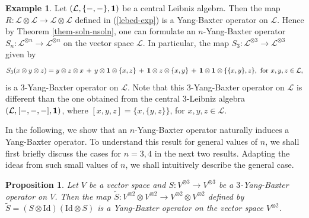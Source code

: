 \documentclass[a4paper,reqno,10pt]{amsart}
\theoremstyle{plain}
\newtheorem{prop}[thm]{Proposition}
\theoremstyle{definition}
\newtheorem{exam}[thm]{Example}
\theoremstyle{remark}
\begin{document}
\begin{exam}
    Let $(\mathcal{L} , \{ -, - \} , {\bf 1})$ be a central Leibniz algebra. Then the map $R : \mathcal{L} \otimes \mathcal{L} \rightarrow \mathcal{L} \otimes \mathcal{L}$ defined in (\ref{lebed-exp}) is a Yang-Baxter operator on $\mathcal{L}$. Hence by Theorem \ref{them-soln-nsoln}, one can formulate an $n$-Yang-Baxter operator $S_n : \mathcal{L}^{\otimes n} \rightarrow \mathcal{L}^{\otimes n}$  on the vector space $\mathcal{L}$. In particular, the map $S_3 : \mathcal{L}^{\otimes 3} \rightarrow \mathcal{L}^{\otimes 3}$ given by
\begin{align*}
    S_3 (x \otimes y \otimes z) = y \otimes z \otimes x ~ \! +~ \! y \otimes {\bf 1} \otimes \{ x, z \}  ~ \! +~ \!   {\bf 1} \otimes z \otimes \{ x, y \}  ~ \! +~ \!  {\bf 1} \otimes {\bf 1} \otimes \{ \{ x, y \}, z\}, \text{ for } x, y, z \in \mathcal{L},
\end{align*}
is a $3$-Yang-Baxter operator on $\mathcal{L}.$ Note that this $3$-Yang-Baxter operator on $\mathcal{L}$ is different than the one obtained from the central $3$-Leibniz algebra $(\mathcal{L}, [-, -, - ], {\bf 1})$, where $[x, y, z ] = \{ x, \{ y, z \} \}$, for $x, y, z \in \mathcal{L}$.
\end{exam}


In the following, we show that an $n$-Yang-Baxter operator naturally induces a Yang-Baxter operator. To understand this result for general values of $n$, we shall first briefly discuss the cases for $n=3, 4$ in the next two results. Adapting the ideas from such small values of $n$, we shall intuitively describe the general case.

\begin{prop}
    Let $V$ be a vector space and $S : V^{\otimes 3} \rightarrow V^{\otimes 3}$ be a $3$-Yang-Baxter operator on $V$. Then the map $\widetilde{S} : V^{\otimes 2} \otimes V^{\otimes 2} \rightarrow V^{\otimes 2} \otimes V^{\otimes 2}$ defined by $\widetilde{ S} = (S \otimes \mathrm{Id}) (\mathrm{Id} \otimes S)$ is a Yang-Baxter operator on the vector space $V^{\otimes 2}$.
\end{prop}
\end{document}
